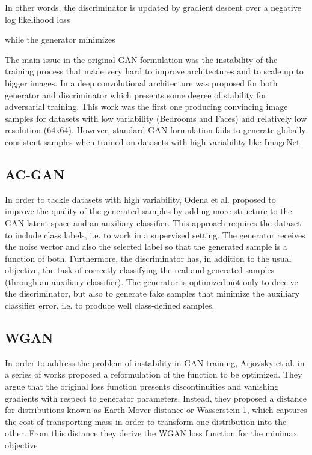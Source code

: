 \documentclass[times,twocolumn]{article}
\begin{document}
In other words, the discriminator is updated by gradient descent over a negative log likelihood loss

while the generator minimizes



The main issue in the original GAN formulation was the instability of the training process that made very hard to improve architectures and to scale up to bigger images.
In \cite{Radford2015} a deep convolutional architecture was proposed for both generator and discriminator which presents some degree of stability for adversarial training. This work was the first one producing convincing image samples for datasets with low
variability (Bedrooms and Faces) and relatively low resolution (64x64). However, standard GAN formulation fails to generate globally consistent samples when trained on datasets with high variability like ImageNet.
\subsection{AC-GAN}

In order to tackle datasets with high variability, Odena et al. \cite{Odena2017} proposed to improve the quality of the generated samples by adding more structure to the GAN latent space and an auxiliary classifier. This approach requires the dataset to include class labels, i.e. to work in a supervised setting. The generator receives the noise vector  and also the selected label  so that the generated sample is a function of both. Furthermore, the discriminator has, in addition to the usual objective, the task of correctly classifying the real and generated samples (through an auxiliary classifier). The generator is optimized not only to deceive the discriminator, but also to generate fake samples that minimize the auxiliary classifier error, i.e. to produce well class-defined samples.
\subsection{WGAN}
In order to address the problem of instability in GAN training, Arjovsky et al. in a series of works \cite{Arjovsky2017, Arjovsky2017b} proposed a reformulation of the function to be optimized. They argue that the original loss function presents discontinuities and vanishing gradients with respect to generator parameters. Instead, they proposed a distance for distributions known as Earth-Mover distance or Wasserstein-1, which captures the cost of transporting mass in order to transform one distribution into the other. From this distance they derive the WGAN loss function for the minimax objective
\end{document}
